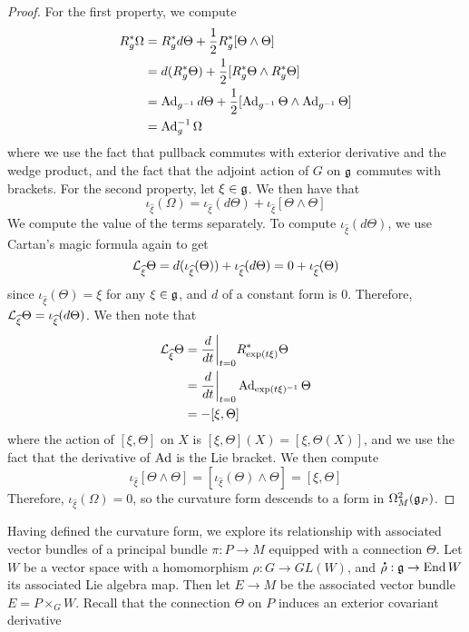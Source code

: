 \begin{proof}
For the first property, we compute
\begin{align*}
R_g^*\Omega &= R_g^*d\Theta + \frac{1}{2} R_g^*[\Theta \wedge \Theta] \\
&= d(R_g^*\Theta)+ \frac{1}{2}[R_g^*\Theta \wedge R_g^*\Theta]\\
&= \operatorname{Ad}_{g^{-1}}d\Theta + \frac{1}{2}[\operatorname{Ad}_{g^{-1}}\Theta \wedge \operatorname{Ad}_{g^{-1}}\Theta] \\
&= \operatorname{Ad}_g^{-1}\Omega
\end{align*}
where we use the fact that pullback commutes with exterior derivative and
the wedge product, and the fact that the adjoint action of $G$ on $\mathfrak{g}$ commutes with
brackets. For the second property, let $\xi \in \mathfrak{g}$. We then have that
\[
\iota_{\widehat{\xi}}(\Omega) = \iota_{\widehat{\xi}}(d\Theta)
+ \iota_{\widehat{\xi}}[\Theta \wedge \Theta]
\]
We compute the value of the terms separately. To compute
$\iota_{\widehat{\xi}}(d\Theta)$, we use Cartan's magic formula again to get
\[
\mathcal{L}_{\widehat{\xi}}\Theta = d(\iota_{\widehat{\xi}}(\Theta))
+ \iota_{\widehat{\xi}}(d\Theta) = 0 + \iota_{\widehat{\xi}}(\Theta)
\]
since $\iota_{\widehat{\xi}}(\Theta) = \xi$ for any $\xi \in \mathfrak{g}$, and $d$ of a
constant form is $0$. Therefore,
$\mathcal{L}_{\widehat{\xi}}\Theta = \iota_{\widehat{\xi}}(d\Theta)$. We then note that
\begin{align*}
\mathcal{L}_{\widehat{\xi}}\Theta &= \frac{d}{dt}\bigg\vert_{t = 0} R_{\exp(t\xi)}^*\Theta \\
&= \frac{d}{dt}\bigg\vert_{t=0} \operatorname{Ad}_{\exp(t\xi)^{-1}}\Theta \\
&= -[\xi, \Theta]
\end{align*}
where the action of $[\xi, \Theta]$ on $X$ is $[\xi, \Theta](X) = [\xi,\Theta(X)]$,
and we use the fact that the derivative of $\operatorname{Ad}$ is the Lie bracket. We then compute
\[
\iota_{\widehat{\xi}}[\Theta \wedge \Theta] =
[\iota_{\widehat{\xi}}(\Theta) \wedge \Theta] = [\xi, \Theta]
\]
Therefore, $\iota_{\widehat{\xi}}(\Omega) = 0$, so the curvature form descends to a
form in $\Omega_M^2(\mathfrak{g}_P)$.
\end{proof}
%
Having defined the curvature form, we explore its relationship with associated
vector bundles of a principal bundle $\pi : P \to M$ equipped with a connection $\Theta$.
Let $W$ be a vector space with a homomorphism $\rho : G \to GL(W)$, and
$\accentset{\mbox{\large\bfseries .}}{\rho} : \mathfrak{g} \to \operatorname{End} W$ its associated Lie algebra map. Then let $E \to M$ be
the associated vector bundle $E = P \times_G W$. Recall that the connection $\Theta$ on
$P$ induces an exterior covariant derivative
